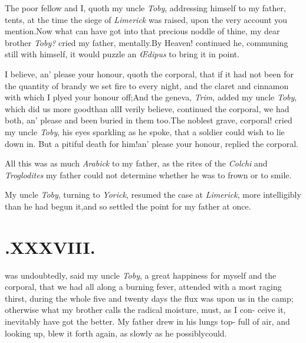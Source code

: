 \documentclass{article}
\begin{document}
The poor fellow and I, quoth my uncle \textit{Toby}, addressing
himself to my father, 
tents, at the time the siege of \textit{Limerick} was raised,
upon the very account you mention.\tsh Now what can
have got\break
into that precious noddle of thine, my dear brother
\textit{Toby?} cried my father,\break 
mentally.\tsh By Heaven! continued\break
he, communing still with himself, it\break
would puzzle an \textit{Œdipus} to bring it in\break
point.\tsh

I believe, an’ please your honour,\break
quoth the corporal, that if
it had not been for the quantity of brandy we set fire to every
night, and the claret and cinnamon with which I plyed your
honour off;\tsk And the geneva, \textit{Trim}, added my uncle
\textit{Toby}, which did us more good\break than all\tsh I verily
believe, continued 
the corporal, we had both, an’ please\break
{}\break
and been buried in them too.\tsh The\break
noblest grave, corporal!  cried my uncle\break
\textit{Toby}, his eyes sparkling as he spoke, that\break
a soldier could wish to lie down in.\tsh\break
But a pitiful death for him!\@ an’ please\break
your honour, replied the corporal.

All this was as much \textit{Arabick} to my father, as the rites
of the \textit{Colchi} and \textit{Tro\-glodites}
\break
my father could not determine whether he was to
frown or to smile.\tsh

My uncle \textit{Toby}, turning to \textit{Yorick},\break
resumed the case
at \textit{Limerick}, more intelligibly than he had begun
it,\tsk and so settled the point for my father at once.

\eject
\noindent\null\par

\section{.\enspace  XXXVIII.}

 was undoubtedly, said my uncle\break
\textit{Toby}, a great happiness for myself\break
and the corporal, that we
had all along a burning fever, attended with a most raging thirst,
during the whole five and twenty days the flux was upon us in the
camp; otherwise what my brother calls the radical moisture,
must, as I con-\break 
ceive it, inevitably have got the better.\break
\tsh My father drew in his lungs top-\break
full of air, and looking up, blew it\break
forth again, as slowly as he possibly\break could.\tsh
\end{document}
